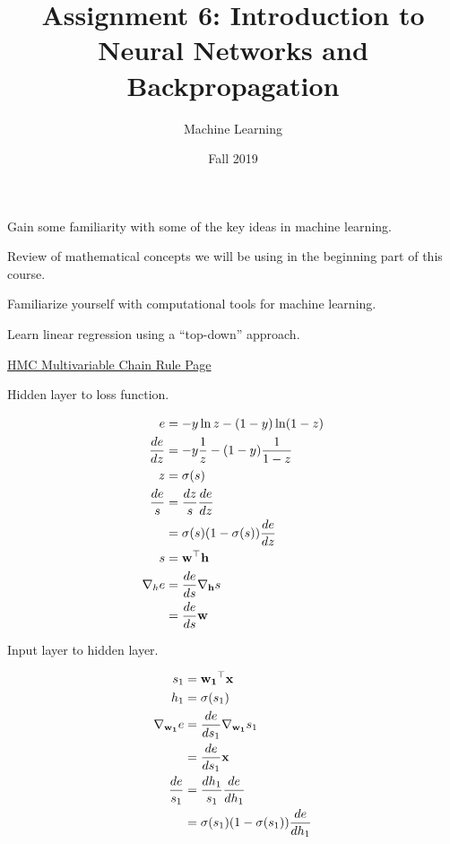 \documentclass[assignment06_Solutions]{subfiles}
\title{Assignment 6: Introduction to Neural Networks and Backpropagation}
\author{Machine Learning}
\date{Fall 2019}
\begin{document}
\maketitle
\thispagestyle{firstpage}


\begin{learningobjectives}
\bi
\item Gain some familiarity with some of the key ideas in machine learning.
\item Review of mathematical concepts we will be using in the beginning part of this course.
\item Familiarize yourself with computational tools for machine learning.
\item Learn linear regression using a ``top-down'' approach.
\ei
\end{learningobjectives}


\href{https://www.math.hmc.edu/calculus/tutorials/multichainrule/}{HMC Multivariable Chain Rule Page}

Hidden layer to loss function.

\begin{align}
e &= -y \ln z - (1-y) \ln (1-z) \\
\frac{de}{dz} &= -y \frac{1}{z} - (1-y) \frac{1}{1-z}\\
z &= \sigma(s) \\
\frac{d e}{s} &= \frac{d z}{s}  \frac{de}{dz} \\
&= \sigma(s)(1 - \sigma(s)) \frac{de}{dz} \\
s &= \mathbf{w}^\top \mathbf{h} \\
\nabla_{h} e &=  \frac{d e}{d s} \nabla_{\mathbf{h}}{s} \\
&=   \frac{d e}{d s}  \mathbf{w}
\end{align}

Input layer to hidden layer.

\begin{align}
s_1 &= \mathbf{w_1}^\top \mathbf{x}\\
h_1 &= \sigma(s_1) \\
\nabla_{\mathbf{w_1}} e &=  \frac{d e}{d s_1} \nabla_{\mathbf{w_1}}{s_1} \\
&=   \frac{d e}{d s_1}  \mathbf{x} \\
\frac{d e}{s_1} &= \frac{d h_1}{s_1}  \frac{de}{dh_1} \\
&= \sigma(s_1)(1 - \sigma(s_1)) \frac{de}{dh_1}
\end{align}
\end{document}
